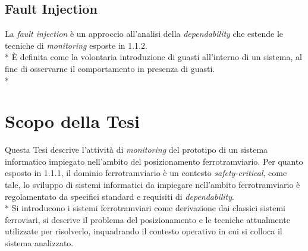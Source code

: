 \subsection{Fault Injection}
La \emph{fault injection} \`e un approccio all'analisi della \emph{dependability} che estende le tecniche di \emph{monitoring} esposte in 1.1.2.\\*
\`E definita come la volontaria introduzione di guasti all'interno di un sistema, al fine di osservarne il comportamento in presenza di guasti. \cite{faultinj1} \cite{faultinj2} \cite{faultinj3}\\*

\section{Scopo della Tesi}
Questa Tesi descrive l'attivit\`a di \emph{monitoring} del prototipo di un sistema informatico impiegato nell'ambito del posizionamento ferrotramviario. Per quanto esposto in 1.1.1, il dominio ferrotramviario \`e un contesto \emph{safety-critical}, come tale, lo sviluppo di sistemi informatici da impiegare nell'ambito ferrotramviario \`e regolamentato da specifici standard e requisiti di \emph{dependability}.\\*
Si introducono i sistemi ferrotramviari come derivazione dai classici sistemi ferroviari, si descrive il problema del posizionamento e le tecniche attualmente utilizzate per risolverlo, inquadrando il contesto operativo in cui si colloca il sistema analizzato.
